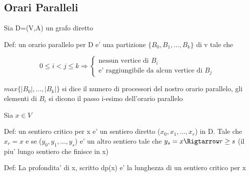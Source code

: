 \documentclass{article}
\begin{document}
        \subsection{Orari Paralleli}
        \begin{flushleft}
          Sia D=(V,A) un grafo diretto
        \end{flushleft}
        \begin{flushleft}
          Def: un orario parallelo per D e' una partizione $\{B_0,B_1,...,B_k\}$ di v tale che 
        \end{flushleft}
        \begin{equation*}
          0 \leq i < j \leq k \Rightarrow \begin{cases}
            \text{nessun vertice di $B_i$} \\ 
            \text{e' raggiungibile da alcun vertice di $B_j$}
          \end{cases}
        \end{equation*}
        \begin{flushleft}
          $max\{\mid B_0\mid ,...,\mid B_k\mid \}$ si dice il numero di processori del nostro orario parallelo,
          gli elementi di $B_i$ si dicono il passo i-esimo dell'orario parallelo
        \end{flushleft}
        Sia $x \in V$
        \begin{flushleft}
          Def: un sentiero critico per x e' un sentiero diretto ($x_0,x_1,...,x_r$) in D. Tale che $x_r=x$ e se ($y_0,y_1,...,y_s$) e' un altro sentiero tale che $y_s=x\Rigtarrow r\geq s$
          (il piu' lungo sentiero che finisce in x)
        \end{flushleft}
        \begin{flushleft}
          Def: La profondita' di x, scritto dp(x) e' la lunghezza di un sentiero critico per x
        \end{flushleft}







      
\end{document}
